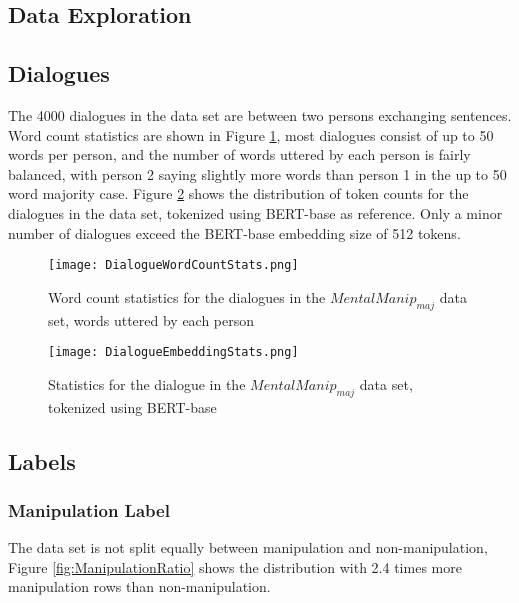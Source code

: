 \documentclass[
	letterpaper, %
	12pt, %
	unnumberedsections, %
	twoside, %
]{LTJournalArticle}
\begin{document}
\begin{appendices}
	\onecolumn
	\section{Data Exploration}\label{appendix:DataExploration}

	\subsection{Dialogues}
	The 4000 dialogues in the data set are between two persons exchanging sentences. Word count statistics are shown in Figure \ref{fig:DialogueWordCount}, most dialogues consist of up to 50 words per person, and the number of words uttered by each person is fairly balanced, with person 2 saying slightly more words than person 1 in the up to 50 word majority case. Figure \ref{fig:DialogueEmbedding} shows the distribution of token counts for the dialogues in the data set, tokenized using BERT-base as reference. Only a minor number of dialogues exceed the BERT-base embedding size of 512 tokens.


	\begin{figure}[!htp] %
		\centering
		\texttt{[image: DialogueWordCountStats.png]}
		\caption{Word count statistics for the dialogues in the $MentalManip_{maj}$ data set, words uttered by each person}
		\label{fig:DialogueWordCount}
	\end{figure}

	\begin{figure}[!htp] %
		\centering
		\texttt{[image: DialogueEmbeddingStats.png]}
		\caption{Statistics for the dialogue in the $MentalManip_{maj}$ data set, tokenized using BERT-base}
		\label{fig:DialogueEmbedding}
	\end{figure}


	\subsection{Labels}\label{appendix:Labels}

	\subsubsection{Manipulation Label}
	The data set is not split equally between manipulation and non-manipulation, Figure \ref{fig:ManipulationRatio} shows the distribution with 2.4 times more manipulation rows than non-manipulation.


\end{appendices}
\end{document}
